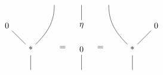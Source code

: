 \[
  \begin{tikzpicture}[baseline]
    \path
    (-1,1) node(0) {0}
    (1,2) node(x) {}
    (0,0) node(*) {*}
    (0,-1) node(res) {}
    ;

    \draw (0) -- (*);
    \draw (x) to[out=270,in=45] (*);
    \draw (*) -- (res);
  \end{tikzpicture}
  =\quad
  \begin{tikzpicture}[baseline]
    \path
    (0,0) node(0) {0}
    (0,2) node(x) {}
    (0,-1) node(res) {}
    (0,1) node(del) {$\eta$}
    ;

    \draw (0) -- (res);
    \draw (x) -- (del);
  \end{tikzpicture}
  \quad=
  \begin{tikzpicture}[baseline]
    \path
    (1,1) node(0) {0}
    (-1,2) node(x) {}
    (0,0) node(*) {*}
    (0,-1) node(res) {}
    ;

    \draw (0) -- (*);
    \draw (x) to[out=270,in=135] (*);
    \draw (*) -- (res);
  \end{tikzpicture}
\]
